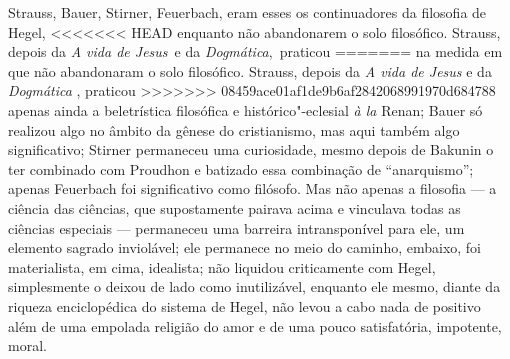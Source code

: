 \noindent{}Strauss, Bauer, Stirner, Feuerbach,
eram esses os continuadores da filosofia
de Hegel,
<<<<<<< HEAD
enquanto não abandonarem o solo
filosófico. Strauss, %
depois da \emph{A vida de Jesus} \textbar{}\,e
da \emph{Dogmática},\,\textbar{} praticou
=======
na medida em que não abandonaram o solo
filosófico. Strauss,
depois da \emph{A vida de Jesus }\textbar{} e
da \emph{Dogmática} \textbar{}, praticou
>>>>>>> 08459ace01af1de9b6af2842068991970d684788
apenas ainda a beletrística filosófica e histórico"-eclesial \emph{à
la} Renan; Bauer só
realizou algo no âmbito da gênese do cristianismo, mas aqui também algo
significativo; Stirner permaneceu
uma curiosidade, mesmo depois de  Bakunin o ter combinado com Proudhon e
batizado essa combinação de ``anarquismo''; apenas
Feuerbach foi
significativo como filósofo. Mas não apenas a filosofia --- a ciência das
ciências, que supostamente pairava acima e vinculava todas as ciências
especiais --- permaneceu uma barreira intransponível para ele, um elemento
sagrado inviolável; ele permanece no meio do caminho, embaixo, foi
materialista, em cima, idealista; não liquidou criticamente
com Hegel,
simplesmente o deixou de lado como inutilizável, enquanto ele mesmo,
diante da riqueza enciclopédica do sistema
de Hegel,
não levou a cabo nada de positivo além de uma empolada religião do amor
e de uma pouco satisfatória, impotente, moral.


